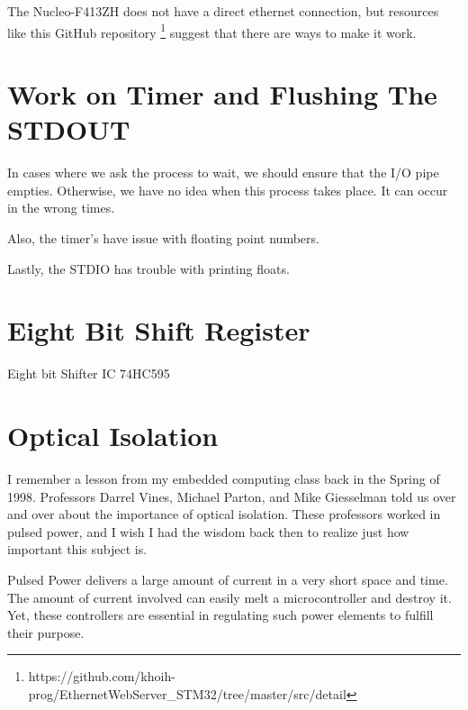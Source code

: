 \documentclass{article}
\begin{document}
The Nucleo-F413ZH does not have a direct ethernet connection, but resources like this GitHub repository \footnote{https://github.com/khoih-prog/EthernetWebServer_STM32/tree/master/src/detail} suggest that there are ways to make it work.


\section{Work on Timer and Flushing The STDOUT} %
\label{sec:work_on_timer_and_flushing_the_stdout}

In cases where we ask the process to wait, we should ensure that the I/O pipe empties.  Otherwise, we have no idea when this process takes place.  It can occur in the wrong times.

Also, the timer's have issue with floating point numbers.

Lastly, the STDIO has trouble with printing floats.   



\section{Eight Bit Shift Register} %
\label{sec:eight_bit_shift_register}

Eight bit Shifter IC 74HC595 



\section{Optical Isolation} %
\label{sec:optical_isolation}

I remember a lesson from my embedded computing class back in the Spring of 1998.  Professors Darrel Vines, Michael Parton, and Mike Giesselman told us over and over about the importance of optical isolation.  These professors worked in pulsed power, and I wish I had the wisdom back then to realize just how important this subject is.  %

Pulsed Power delivers a large amount of current in a very short space and time.  The amount of current involved can easily melt a microcontroller and destroy it.  Yet, these controllers are essential in regulating such power elements to fulfill their purpose.  
\end{document}
